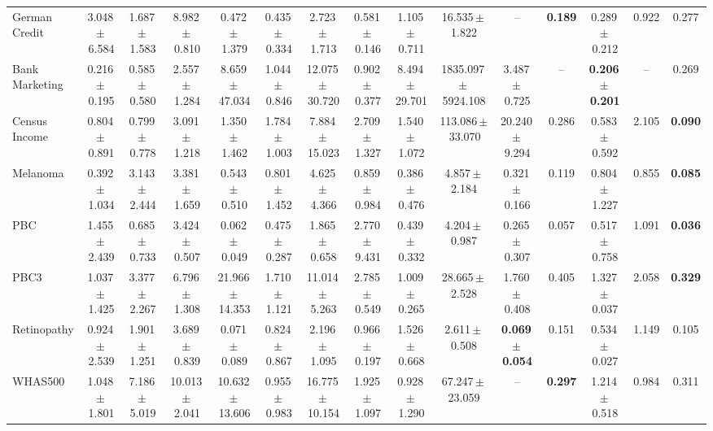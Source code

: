 \documentclass[8pt]{extarticle}
\begin{document}
\begin{longtable}{l*{14}{c}}
German Credit & 3.048\,$\pm$\,6.584 & 1.687\,$\pm$\,1.583 & 8.982\,$\pm$\,0.810 & 0.472\,$\pm$\,1.379 & 0.435\,$\pm$\,0.334 & 2.723\,$\pm$\,1.713 & 0.581\,$\pm$\,0.146 & 1.105\,$\pm$\,0.711 & 16.535\,$\pm$\,1.822 & -- & \textbf{0.189} & 0.289\,$\pm$\,0.212 & 0.922 & 0.277 \\
Bank Marketing & 0.216\,$\pm$\,0.195 & 0.585\,$\pm$\,0.580 & 2.557\,$\pm$\,1.284 & 8.659\,$\pm$\,47.034 & 1.044\,$\pm$\,0.846 & 12.075\,$\pm$\,30.720 & 0.902\,$\pm$\,0.377 & 8.494\,$\pm$\,29.701 & 1835.097\,$\pm$\,5924.108 & 3.487\,$\pm$\,0.725 & -- & \textbf{0.206\,$\pm$\,0.201} & -- & 0.269 \\
Census Income & 0.804\,$\pm$\,0.891 & 0.799\,$\pm$\,0.778 & 3.091\,$\pm$\,1.218 & 1.350\,$\pm$\,1.462 & 1.784\,$\pm$\,1.003 & 7.884\,$\pm$\,15.023 & 2.709\,$\pm$\,1.327 & 1.540\,$\pm$\,1.072 & 113.086\,$\pm$\,33.070 & 20.240\,$\pm$\,9.294 & 0.286 & 0.583\,$\pm$\,0.592 & 2.105 & \textbf{0.090} \\
Melanoma & 0.392\,$\pm$\,1.034 & 3.143\,$\pm$\,2.444 & 3.381\,$\pm$\,1.659 & 0.543\,$\pm$\,0.510 & 0.801\,$\pm$\,1.452 & 4.625\,$\pm$\,4.366 & 0.859\,$\pm$\,0.984 & 0.386\,$\pm$\,0.476 & 4.857\,$\pm$\,2.184 & 0.321\,$\pm$\,0.166 & 0.119 & 0.804\,$\pm$\,1.227 & 0.855 & \textbf{0.085} \\
PBC & 1.455\,$\pm$\,2.439 & 0.685\,$\pm$\,0.733 & 3.424\,$\pm$\,0.507 & 0.062\,$\pm$\,0.049 & 0.475\,$\pm$\,0.287 & 1.865\,$\pm$\,0.658 & 2.770\,$\pm$\,9.431 & 0.439\,$\pm$\,0.332 & 4.204\,$\pm$\,0.987 & 0.265\,$\pm$\,0.307 & 0.057 & 0.517\,$\pm$\,0.758 & 1.091 & \textbf{0.036} \\
PBC3 & 1.037\,$\pm$\,1.425 & 3.377\,$\pm$\,2.267 & 6.796\,$\pm$\,1.308 & 21.966\,$\pm$\,14.353 & 1.710\,$\pm$\,1.121 & 11.014\,$\pm$\,5.263 & 2.785\,$\pm$\,0.549 & 1.009\,$\pm$\,0.265 & 28.665\,$\pm$\,2.528 & 1.760\,$\pm$\,0.408 & 0.405 & 1.327\,$\pm$\,0.037 & 2.058 & \textbf{0.329} \\
Retinopathy & 0.924\,$\pm$\,2.539 & 1.901\,$\pm$\,1.251 & 3.689\,$\pm$\,0.839 & 0.071\,$\pm$\,0.089 & 0.824\,$\pm$\,0.867 & 2.196\,$\pm$\,1.095 & 0.966\,$\pm$\,0.197 & 1.526\,$\pm$\,0.668 & 2.611\,$\pm$\,0.508 & \textbf{0.069\,$\pm$\,0.054} & 0.151 & 0.534\,$\pm$\,0.027 & 1.149 & 0.105 \\
WHAS500 & 1.048\,$\pm$\,1.801 & 7.186\,$\pm$\,5.019 & 10.013\,$\pm$\,2.041 & 10.632\,$\pm$\,13.606 & 0.955\,$\pm$\,0.983 & 16.775\,$\pm$\,10.154 & 1.925\,$\pm$\,1.097 & 0.928\,$\pm$\,1.290 & 67.247\,$\pm$\,23.059 & -- & \textbf{0.297} & 1.214\,$\pm$\,0.518 & 0.984 & 0.311 \\

\end{longtable}
\end{document}
